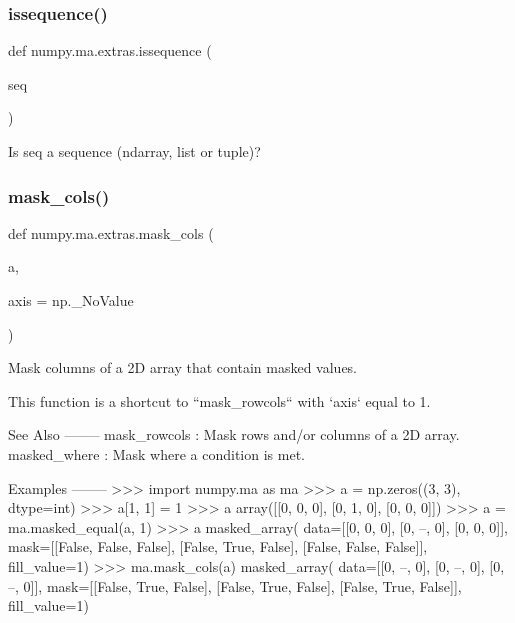 \subsubsection{\texorpdfstring{issequence()}{issequence()}}
{\footnotesize\ttfamily def numpy.\+ma.\+extras.\+issequence (\begin{DoxyParamCaption}\item[{}]{seq }\end{DoxyParamCaption})}

\begin{DoxyVerb}Is seq a sequence (ndarray, list or tuple)?\end{DoxyVerb}
 \mbox{\label{namespacenumpy_1_1ma_1_1extras_a853d98855786af0c3b220a467e05c75d}} 
\subsubsection{\texorpdfstring{mask\+\_\+cols()}{mask\_cols()}}
{\footnotesize\ttfamily def numpy.\+ma.\+extras.\+mask\+\_\+cols (\begin{DoxyParamCaption}\item[{}]{a,  }\item[{}]{axis = {\ttfamily np.\+\_\+NoValue} }\end{DoxyParamCaption})}

\begin{DoxyVerb}Mask columns of a 2D array that contain masked values.

This function is a shortcut to ``mask_rowcols`` with `axis` equal to 1.

See Also
--------
mask_rowcols : Mask rows and/or columns of a 2D array.
masked_where : Mask where a condition is met.

Examples
--------
>>> import numpy.ma as ma
>>> a = np.zeros((3, 3), dtype=int)
>>> a[1, 1] = 1
>>> a
array([[0, 0, 0],
       [0, 1, 0],
       [0, 0, 0]])
>>> a = ma.masked_equal(a, 1)
>>> a
masked_array(
  data=[[0, 0, 0],
        [0, --, 0],
        [0, 0, 0]],
  mask=[[False, False, False],
        [False,  True, False],
        [False, False, False]],
  fill_value=1)
>>> ma.mask_cols(a)
masked_array(
  data=[[0, --, 0],
        [0, --, 0],
        [0, --, 0]],
  mask=[[False,  True, False],
        [False,  True, False],
        [False,  True, False]],
  fill_value=1)\end{DoxyVerb}
 \mbox{\label{namespacenumpy_1_1ma_1_1extras_a01c3a574c0e43d85ba78e61c7c6e8d64}} 

